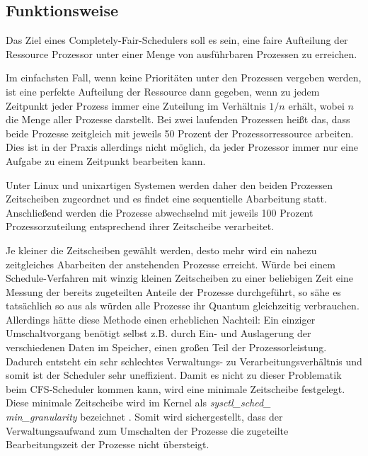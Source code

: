 \subsection{Funktionsweise}\label{s:cfs_fktweise}


Das Ziel eines  Completely-Fair-Schedulers{} soll es sein, eine faire Aufteilung der Ressource Prozessor unter einer Menge von ausführbaren Prozessen zu erreichen.


Im einfachsten Fall, wenn keine Prioritäten unter den Prozessen vergeben werden, ist eine perfekte Aufteilung der Ressource dann gegeben, wenn zu jedem Zeitpunkt jeder Prozess immer eine Zuteilung im Verhältnis $1/n$ erhält, wobei $n$ die Menge aller Prozesse darstellt.
Bei zwei laufenden Prozessen heißt das, dass beide Prozesse zeitgleich mit jeweils 50 Prozent der Prozessorressource arbeiten. Dies ist in der Praxis allerdings nicht möglich, da jeder Prozessor immer nur eine Aufgabe zu einem Zeitpunkt bearbeiten kann.

Unter Linux und unixartigen Systemen werden daher den beiden Prozessen Zeitscheiben zugeordnet und es findet eine sequentielle Abarbeitung statt. Anschließend werden die Prozesse abwechselnd mit jeweils 100 Prozent Prozessorzuteilung entsprechend ihrer Zeitscheibe verarbeitet.

Je kleiner die Zeitscheiben gewählt werden, desto mehr wird ein nahezu zeitgleiches Abarbeiten der anstehenden Prozesse erreicht.
Würde bei einem Schedule-Verfahren mit winzig kleinen Zeitscheiben zu einer beliebigen Zeit eine Messung der bereits zugeteilten Anteile der Prozesse durchgeführt, so sähe es tatsächlich so aus als wür\-den alle Prozesse ihr Quantum gleichzeitig verbrauchen.
Allerdings hätte diese Methode einen erheblichen Nachteil: Ein einziger Umschalt\-vorgang be\-nötigt selbst z.B. durch Ein- und Auslagerung der verschiedenen Daten im Speicher, einen großen Teil der Prozessorleistung. Dadurch entsteht ein sehr schlechtes Verwaltungs- zu Verarbeitungs\-verhält\-nis und somit ist der Scheduler sehr uneffizient. Damit es nicht zu dieser Problematik beim CFS-Scheduler kommen kann, wird eine minimale Zeitscheibe festgelegt. Diese minimale Zeitscheibe wird im Kernel als \textit{sysctl\_sched\_\\min\_granu\-larity} bezeichnet \cite{paperfairness}.
Somit wird sichergestellt, dass der Verwaltungsaufwand zum Umschalten der Prozesse die zugeteilte Bearbeitungszeit der Prozesse nicht übersteigt.


